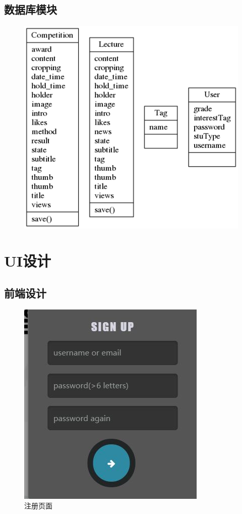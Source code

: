 \documentclass[UTF8]{ctexart}
\begin{document}
\begin{spacing}{1.3}
\subsection{数据库模块}
		\begin{figure}[H]
				\centering
				\includegraphics[width=\textwidth]{images//classes_model.png}
		\end{figure}
		
\section{UI设计}
\subsection{前端设计}
\begin{figure}[h]
    \centering
    \includegraphics{images//signup.JPG}
    \caption{注册页面}
    \label{imgaes//fig:signup}
\end{figure}


\end{spacing}
\end{document}
